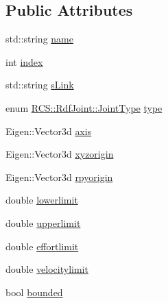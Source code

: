 \subsection*{Public Attributes}
\begin{DoxyCompactItemize}
\item 
std\-::string \hyperlink{structRCS_1_1RdfJoint_a3748d3036414a31ffd0cd77ff0b846fa}{name}
\item 
int \hyperlink{structRCS_1_1RdfJoint_ae0cf15f02a2efd536db12c07e0a60489}{index}
\item 
std\-::string \hyperlink{structRCS_1_1RdfJoint_a85cde3a02210336c5ab32c55d31da114}{s\-Link}
\item 
enum \hyperlink{structRCS_1_1RdfJoint_a95b90d76b64454c209ab4b7901dbb09d}{R\-C\-S\-::\-Rdf\-Joint\-::\-Joint\-Type} \hyperlink{structRCS_1_1RdfJoint_a7f6e07b79084eff50b23c31973da0276}{type}
\item 
Eigen\-::\-Vector3d \hyperlink{structRCS_1_1RdfJoint_ab909bc4a9e752156569e2ca3b3772841}{axis}
\item 
Eigen\-::\-Vector3d \hyperlink{structRCS_1_1RdfJoint_a37bb255f0c5c5bca1b6b64ff86e52aa6}{xyzorigin}
\item 
Eigen\-::\-Vector3d \hyperlink{structRCS_1_1RdfJoint_a52525c53ffa8ce0c72a3720d68a13056}{rpyorigin}
\item 
double \hyperlink{structRCS_1_1RdfJoint_af3a5cd36719ec5bd35d9656f00ad8d74}{lowerlimit}
\item 
double \hyperlink{structRCS_1_1RdfJoint_af7b741b9f2d771dc519472102538b935}{upperlimit}
\item 
double \hyperlink{structRCS_1_1RdfJoint_adbc5630cf0d07ed47daab7f62971038e}{effortlimit}
\item 
double \hyperlink{structRCS_1_1RdfJoint_a3419ee3cf55c8d8dd88fa7277a4dae12}{velocitylimit}
\item 
bool \hyperlink{structRCS_1_1RdfJoint_a9dea514a1ff741958c3fadab7c3de730}{bounded}
\end{DoxyCompactItemize}


